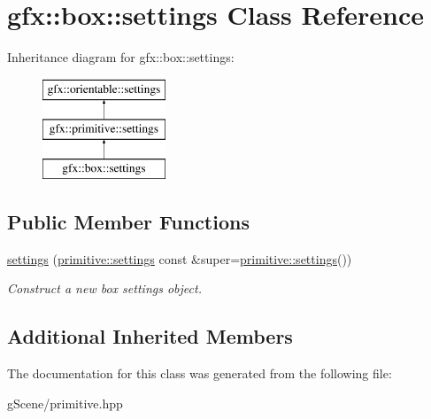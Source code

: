 \hypertarget{classgfx_1_1box_1_1settings}{\section{gfx\-:\-:box\-:\-:settings Class Reference}
\label{classgfx_1_1box_1_1settings}
}
Inheritance diagram for gfx\-:\-:box\-:\-:settings\-:\begin{figure}[H]
\begin{center}
\leavevmode
\includegraphics[height=3.000000cm]{classgfx_1_1box_1_1settings}
\end{center}
\end{figure}
\subsection*{Public Member Functions}
\begin{DoxyCompactItemize}
\item 
\hypertarget{classgfx_1_1box_1_1settings_a68534d3ced70d78657f99de344e48bf0}{\hyperlink{classgfx_1_1box_1_1settings_a68534d3ced70d78657f99de344e48bf0}{settings} (\hyperlink{classgfx_1_1primitive_1_1settings}{primitive\-::settings} const \&super=\hyperlink{classgfx_1_1primitive_1_1settings}{primitive\-::settings}())}\label{classgfx_1_1box_1_1settings_a68534d3ced70d78657f99de344e48bf0}

\begin{DoxyCompactList}\small\item\em Construct a new box settings object. \end{DoxyCompactList}\end{DoxyCompactItemize}
\subsection*{Additional Inherited Members}


The documentation for this class was generated from the following file\-:\begin{DoxyCompactItemize}
\item 
g\-Scene/primitive.\-hpp\end{DoxyCompactItemize}
